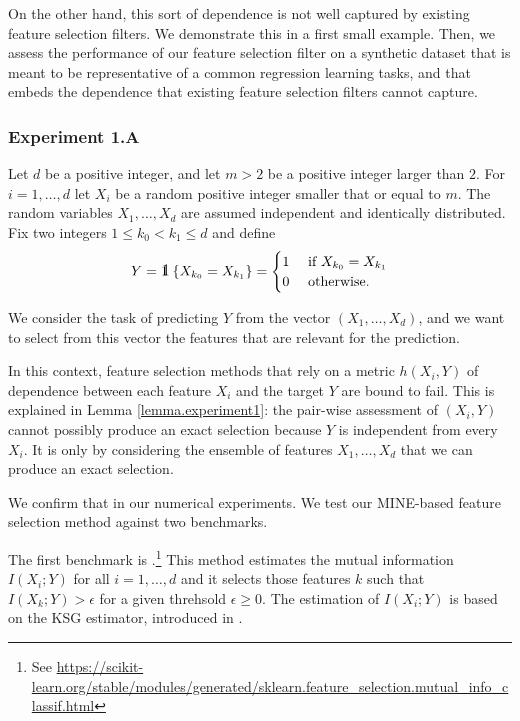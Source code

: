 On the other hand,
this sort of dependence
is not well captured by
existing feature selection filters. 
We demonstrate this in a first small example.
Then,
we assess the performance of our feature selection filter 
on a synthetic dataset that 
is meant to be representative of a common regression learning tasks,
and that embeds the dependence that 
existing feature selection filters cannot capture.

\subsubsection{Experiment 1.A}
Let
$d$
be a positive integer,
and 
let 
$m > 2$
be  a positive integer larger than $2$.
For
$i = 1, \dots, d$
let
$X_i$
be a random  positive integer
smaller that or equal to $m$.
The random variables
$X_1, \dots, X_d$
are assumed independent and identically distributed.
Fix 
two integers
$ 1 \leq k_0 < k_1 \leq d$
and 
define
\begin{equation}
	\label{eq.exp1Y}
	Y = \one\left\lbrace
	X_{k_0} = X_{k_1}
	\right
	\rbrace
	=
	\begin{cases}
		1 & \text{ if } X_{k_0} = X_{k_1}
		\\
		0 & \text{ otherwise}.
	\end{cases}
\end{equation}

We consider the task of predicting $Y$ from the vector 
$(X_1, \dots, X_d)$,
and 
we want to select 
from this vector 
the features that are relevant for the prediction.

In this context,
feature selection methods
that rely on a metric $h(X_i, Y)$ of dependence between 
each feature $X_i$ and the target $Y$ are bound to fail.
This is explained in Lemma \ref{lemma.experiment1}:
the pair-wise assessment of $(X_i, Y)$ 
cannot possibly produce an exact selection
because $Y$ is independent from every $X_i$. 
It is only by considering 
the ensemble of features $X_1, \dots, X_d$ 
that we can produce an exact selection.

We confirm that in our numerical experiments. 
We test 
our MINE-based feature selection method 
against 
two benchmarks.

The first benchmark is 
.\footnote{
See
\url{https://scikit-learn.org/stable/modules/generated/sklearn.feature\_selection.mutual\_info\_classif.html}
}
This method estimates the mutual information 
$I(X_i; Y)$ for all $i = 1, \dots, d$
and 
it selects those features $k$ such that 
$I(X_k; Y) > \epsilon$
for a given threhsold $\epsilon \geq 0$. 
The estimation of $I(X_i; Y)$ is based on the KSG estimator, 
introduced in 
\cite{KSG04est}.

